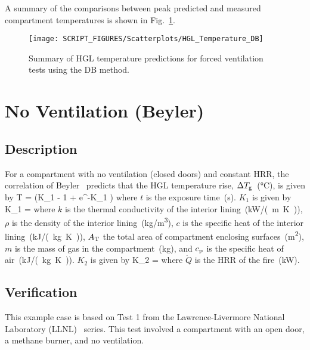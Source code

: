 A summary of the comparisons between peak predicted and measured compartment temperatures is shown in Fig.~\ref{HGL_Summary_Forced_Ventilation_DB}.

\begin{figure}[!ht]
\begin{center}
\texttt{[image: SCRIPT\_FIGURES/Scatterplots/HGL\_Temperature\_DB]}
\end{center}
\caption[Summary of HGL temperature predictions for forced ventilation tests (DB)]
{Summary of HGL temperature predictions for forced ventilation tests using the DB method.}
\label{HGL_Summary_Forced_Ventilation_DB}
\end{figure}


\clearpage


\section{No Ventilation (Beyler)}
\label{sec:Beyler}

\subsection*{Description}

For a compartment with no ventilation (closed doors) and constant HRR, the correlation of Beyler~\cite{SFPE:Walton} predicts that the HGL temperature rise, $\Delta T\sb{g}$~(\si{\celsius}), is given by
\be
\Delta T =  (K_1  - 1 + e^{-K_1 })
\label{eq:Beyler}
\ee
where $t$ is the exposure time~(\si{\second}). $K_1$ is given by
\be
K_1 = 
\label{eq:Beyler_K1}
\ee
where $k$ is the thermal conductivity of the interior lining~(\si{kW/(m.K)}), $\rho$ is the density of the interior lining~(\si{kg/m^3}), $c$ is the specific heat of the interior lining~(\si{kJ/(kg.K)}), $A\sb{T}$ the total area of compartment enclosing surfaces~(\si{m^2}), $m$ is the mass of gas in the compartment~(\si{kg}), and $c\sb{p}$ is the specific heat of air~(\si{kJ/(kg.K)}). $K_2$ is given by
\be
K_2 = 
\label{eq:Beyler_K2}
\ee
where $\dot Q$ is the HRR of the fire~(\si{kW}).


\clearpage


\subsection*{Verification}

This example case is based on Test 1 from the Lawrence-Livermore National Laboratory (LLNL)~\cite{Foote:LLNL1986} series. This test involved a compartment with an open door, a methane burner, and no ventilation.

